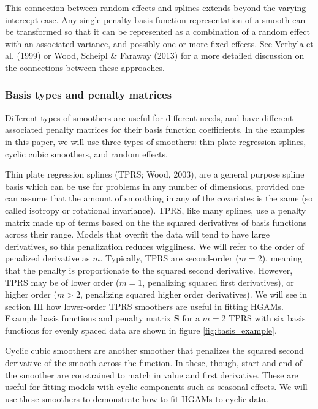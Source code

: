 \documentclass[12pt]{article}
\begin{document}
This connection between random effects and splines extends beyond the
varying-intercept case. Any single-penalty basis-function representation
of a smooth can be transformed so that it can be represented as a
combination of a random effect with an associated variance, and possibly
one or more fixed effects. See Verbyla et al. (1999) or Wood, Scheipl \&
Faraway (2013) for a more detailed discussion on the connections between
these approaches.

\subsubsection{Basis types and penalty
matrices}\label{basis-types-and-penalty-matrices}

Different types of smoothers are useful for different needs, and have
different associated penalty matrices for their basis function
coefficients. In the examples in this paper, we will use three types of
smoothers: thin plate regression splines, cyclic cubic smoothers, and
random effects.

Thin plate regression splines (TPRS; Wood, 2003), are a general purpose
spline basis which can be use for problems in any number of dimensions,
provided one can assume that the amount of smoothing in any of the
covariates is the same (so called isotropy or rotational invariance).
TPRS, like many splines, use a penalty matrix made up of terms based on
the the squared derivatives of basis functions across their range.
Models that overfit the data will tend to have large derivatives, so
this penalization reduces wiggliness. We will refer to the order of
penalized derivative as \(m\). Typically, TPRS are second-order
(\(m=2\)), meaning that the penalty is proportionate to the squared
second derivative. However, TPRS may be of lower order (\(m=1\),
penalizing squared first derivatives), or higher order (\(m > 2\),
penalizing squared higher order derivatives). We will see in section III
how lower-order TPRS smoothers are useful in fitting HGAMs. Example
basis functions and penalty matrix \(\mathbf{S}\) for a \(m=2\) TPRS
with six basis functions for evenly spaced data are shown in figure
\ref{fig:basis_example}.

Cyclic cubic smoothers are another smoother that penalizes the squared
second derivative of the smooth across the function. In these, though,
start and end of the smoother are constrained to match in value and
first derivative. These are useful for fitting models with cyclic
components such as seasonal effects. We will use these smoothers to
demonstrate how to fit HGAMs to cyclic data.
\end{document}
